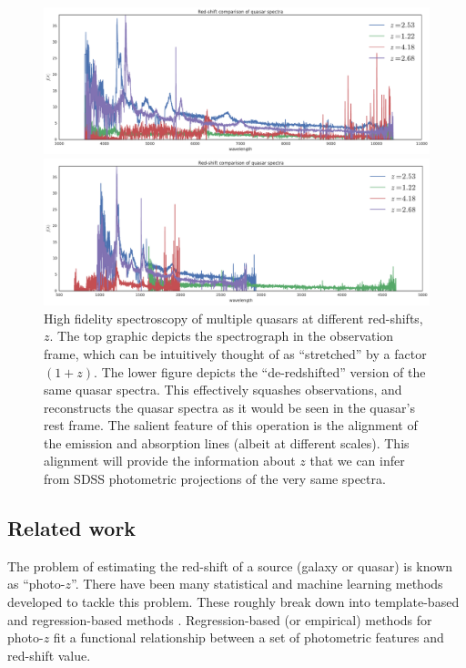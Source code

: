 \documentclass{article}
\begin{document}
\begin{figure}[ht]
\vskip 0.2in
\begin{center}
\centerline{\includegraphics[width=2\columnwidth]{../figs/quasar_redshift_obs_frame}}
\centerline{\includegraphics[width=2\columnwidth]{../figs/quasar_redshift_rest_frame}}
\caption{High fidelity spectroscopy of multiple quasars at different red-shifts, $z$.  The top graphic depicts the spectrograph in the observation frame, which can be intuitively thought of as ``stretched'' by a factor $(1+z)$.  The lower figure depicts the ``de-redshifted'' version of the same quasar spectra.  This effectively squashes observations, and reconstructs the quasar spectra as it would be seen in the quasar's rest frame.  The salient feature of this operation is the alignment of the emission and absorption lines (albeit at different scales).  This alignment will provide the information about $z$ that we can infer from SDSS photometric projections of the very same spectra.}
\label{fig:frames}
\end{center}
\vskip -0.2in
\end{figure} 

\subsection{Related work}
The problem of estimating the red-shift of a source (galaxy or quasar) is known as ``photo-$z$''.  There have been many statistical and machine learning methods developed to tackle this problem. These roughly break down into template-based and regression-based methods \cite{walcher2011fitting}.  Regression-based (or empirical) methods for photo-$z$ fit a functional relationship between a set of photometric features and red-shift value.  
\end{document}
